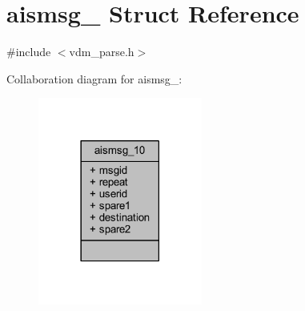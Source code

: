 \hypertarget{structaismsg__10}{}\section{aismsg\+\_ Struct Reference}
\label{structaismsg__10}


{\ttfamily \#include $<$vdm\+\_\+parse.\+h$>$}



Collaboration diagram for aismsg\+\_\+:
\nopagebreak
\begin{figure}[H]
\begin{center}
\leavevmode
\includegraphics[width=153pt]{structaismsg__10__coll__graph}
\end{center}
\end{figure}
